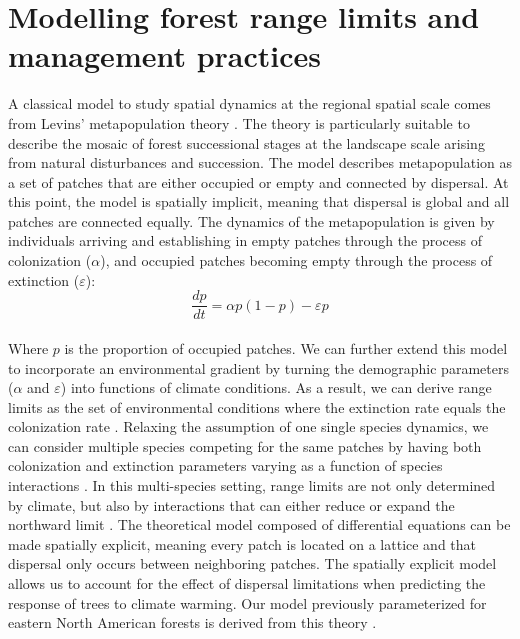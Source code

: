 \hypertarget{modelling-forest-range-limits-and-management-practices}{%
\section{Modelling forest range limits and management
practices}\label{modelling-forest-range-limits-and-management-practices}}

A classical model to study spatial dynamics at the regional spatial
scale comes from Levins' metapopulation theory \citep{Levins1969}. The
theory is particularly suitable to describe the mosaic of forest
successional stages at the landscape scale arising from natural
disturbances and succession. The model describes metapopulation as a set
of patches that are either occupied or empty and connected by dispersal.
At this point, the model is spatially implicit, meaning that dispersal
is global and all patches are connected equally. The dynamics of the
metapopulation is given by individuals arriving and establishing in
empty patches through the process of colonization (\(\alpha\)), and
occupied patches becoming empty through the process of extinction
(\(\varepsilon\)):\\

\begin{equation}
\frac{dp}{dt} = \alpha p (1 - p) - \varepsilon p
\label{eq:metapop}\end{equation}\\

Where \(p\) is the proportion of occupied patches. We can further extend
this model to incorporate an environmental gradient by turning the
demographic parameters (\(\alpha\) and \(\varepsilon\)) into functions
of climate conditions. As a result, we can derive range limits as the
set of environmental conditions where the extinction rate equals the
colonization rate \citep{Holt2005}. Relaxing the assumption of one
single species dynamics, we can consider multiple species competing for
the same patches by having both colonization and extinction parameters
varying as a function of species interactions \citep{Gravel2020}. In
this multi-species setting, range limits are not only determined by
climate, but also by interactions that can either reduce or expand the
northward limit \citep{Godsoe2017}. The theoretical model composed of
differential equations can be made spatially explicit, meaning every
patch is located on a lattice and that dispersal only occurs between
neighboring patches. The spatially explicit model allows us to account
for the effect of dispersal limitations when predicting the response of
trees to climate warming. Our model previously parameterized for eastern
North American forests is derived from this theory \citep{Vissault2020}.\\

